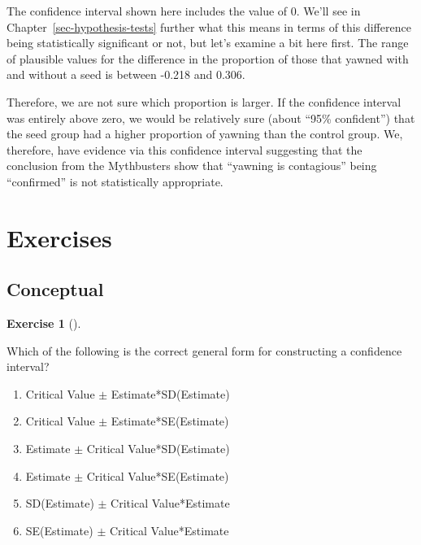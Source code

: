 \documentclass[
  letterpaper,
  DIV=11,
  numbers=noendperiod]{scrreprt}
\providecommand{\tightlist}{%
  \setlength{\itemsep}{0pt}\setlength{\parskip}{0pt}}\usepackage{longtable,booktabs,array}
\theoremstyle{definition}
\newtheorem{exercise}{Exercise}[chapter]
\theoremstyle{remark}
\begin{document}
The confidence interval shown here includes the value of 0. We'll see in
Chapter~\ref{sec-hypothesis-tests} further what this means in terms of
this difference being statistically significant or not, but let's
examine a bit here first. The range of plausible values for the
difference in the proportion of those that yawned with and without a
seed is between -0.218 and 0.306.

Therefore, we are not sure which proportion is larger. If the confidence
interval was entirely above zero, we would be relatively sure (about
``95\% confident'') that the seed group had a higher proportion of
yawning than the control group. We, therefore, have evidence via this
confidence interval suggesting that the conclusion from the Mythbusters
show that ``yawning is contagious'' being ``confirmed'' is not
statistically appropriate.

\hypertarget{sec-ex10}{%
\section{Exercises}\label{sec-ex10}}

\hypertarget{sec-ex10-conceptual}{%
\subsection{Conceptual}\label{sec-ex10-conceptual}}

\begin{exercise}[]\protect\hypertarget{exr-ch10-c01}{}\label{exr-ch10-c01}

Which of the following is the correct general form for constructing a
confidence interval?

\begin{enumerate}
\def\labelenumi{\alph{enumi})}
\tightlist
\item
  Critical Value \(\pm\) Estimate*SD(Estimate)
\item
  Critical Value \(\pm\) Estimate*SE(Estimate)
\item
  Estimate \(\pm\) Critical Value*SD(Estimate)
\item
  Estimate \(\pm\) Critical Value*SE(Estimate)
\item
  SD(Estimate) \(\pm\) Critical Value*Estimate
\item
  SE(Estimate) \(\pm\) Critical Value*Estimate
\end{enumerate}

\end{exercise}
\end{document}
